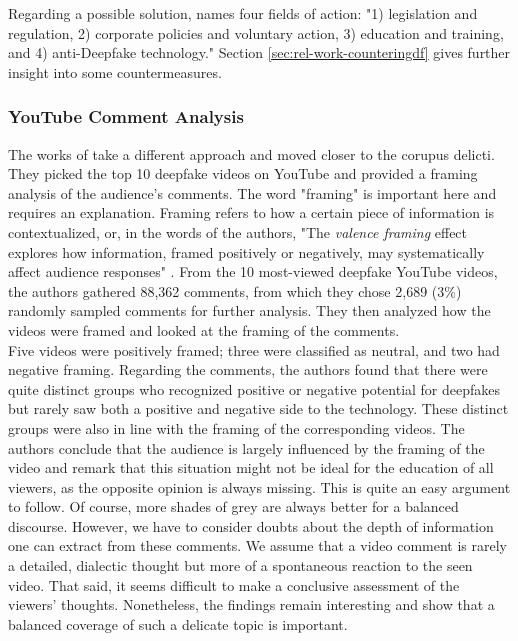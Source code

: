 \documentclass[
  a4paper,  %
  twoside,  %
  bibliography=totoc,
  headsepline,
  cleardoublepage=empty,
  parskip=half,
  draft=false
]{scrbook}
\begin{document}
Regarding a possible solution,  names four fields of action: "1) legislation and regulation, 2) corporate policies and voluntary action, 3) education and training, and 4) anti-Deepfake technology." Section \ref{sec:rel-work-counteringdf} gives further insight into some countermeasures.

\subsubsection*{YouTube Comment Analysis}
The works of \citeauthor{leeBelieveNotBelieve2021} take a different approach and moved closer to the corupus delicti. They picked the top 10 deepfake videos on YouTube and provided a framing analysis of the audience's comments. The word "framing" is important here and requires an explanation. Framing refers to how a certain piece of information is contextualized, or, in the words of the authors, "The \textit{valence framing} effect explores how information, framed positively or negatively, may systematically affect audience responses" \cite{leeBelieveNotBelieve2021}. From the 10 most-viewed deepfake YouTube videos, the authors gathered 88,362 comments, from which they chose 2,689 (3\%) randomly sampled comments for further analysis. They then analyzed how the videos were framed and looked at the framing of the comments.\\
Five videos were positively framed; three were classified as neutral, and two had negative framing. Regarding the comments, the authors found that there were quite distinct groups who recognized positive or negative potential for deepfakes but rarely saw both a positive and negative side to the technology. These distinct groups were also in line with the framing of the corresponding videos. The authors conclude that the audience is largely influenced by the framing of the video and remark that this situation might not be ideal for the education of all viewers, as the opposite opinion is always missing. This is quite an easy argument to follow. Of course, more shades of grey are always better for a balanced discourse. However, we have to consider doubts about the depth of information one can extract from these comments. We assume that a video comment is rarely a detailed, dialectic thought but more of a spontaneous reaction to the seen video. That said, it seems difficult to make a conclusive assessment of the viewers' thoughts. Nonetheless, the findings remain interesting and show that a balanced coverage of such a delicate topic is important.
\end{document}
